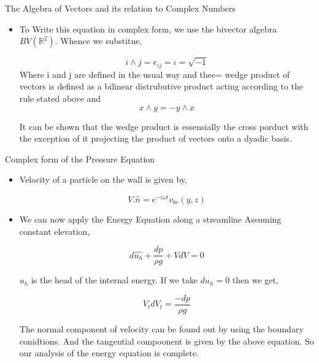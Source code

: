 \documentclass{beamer}
\begin{document}
\begin{frame} {The Algebra of Vectors and its relation to Complex Numbers}

\begin{itemize}

	\item{To Write this equation in complex form, we use the bivector algebra $BV(\mathbb{R}^2)$}. Whence we substitue,
	
		\begin{equation}
		i \wedge j = e_{ij} = \iota = \sqrt{-1}
		\end{equation}
	Where i and j are defined in the usual way and thee= wedge product of vectors is defined as a bilinear distrubutive product acting according to the rule stated above and 
		\begin{equation}
		x \wedge y = - y \wedge x
		\end{equation}
		
		It can be shown that the wedge product is essensially the cross porduct with the exception of it projecting the product of vectors onto a dyadic basis.
	
	
\end{itemize}
\end{frame}

\begin{frame}{Complex form of the Pressure Equation}

\begin{itemize}


\item { Velocity of a particle on the wall is given by, }

	\begin{equation}
	V.\hat{n} = e^{-i\omega t} v_{bc}(y, z)
	\end{equation}
	
\item{We can now apply the Energy Equation along a streamline}
Assuming constant elevation,

	\begin{equation}
	d\hat{u_h} + \frac{dp}{\rho g} + V dV = 0
	\end{equation}
	
	$u_h$ is the head of the internal energy. If we take $du_h = 0$ then we get,
	
	\begin{equation}
	V_t dV_t = \frac{-dp}{\rho g}
	\end{equation}
	
	The normal component of velocity can be found out by using the boundary conidtions. And the tangential compoonent is given by the above equation. So our analysis of the energy equation is complete.
	
\end{itemize}
\end{frame}
\end{document}
